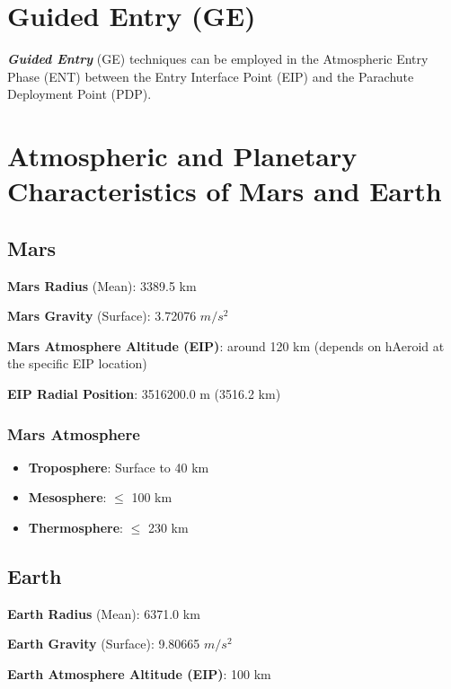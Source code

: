 
\section{Guided Entry (GE)}

    \textbf{\textit{Guided Entry}} (GE) techniques can be employed in the Atmospheric Entry Phase (ENT)
    between the Entry Interface Point (EIP) and the Parachute Deployment Point (PDP).

\section{Atmospheric and Planetary Characteristics of Mars and Earth}

    \subsection{Mars}

        \textbf{Mars Radius} (Mean): 3389.5 km

        \textbf{Mars Gravity} (Surface): 3.72076 $m/s^2$

        \textbf{Mars Atmosphere Altitude (EIP)}: around 120 km (depends on hAeroid at the specific EIP location)

        \textbf{EIP Radial Position}: 3516200.0 m (3516.2 km)

        \subsubsection{Mars Atmosphere}

            \begin{itemize}
                \item \textbf{Troposphere}: Surface to 40 km
                \item \textbf{Mesosphere}: $\leq$ 100 km
                \item \textbf{Thermosphere}: $\leq$ 230 km
            \end{itemize}


    \subsection{Earth}

        \textbf{Earth Radius} (Mean): 6371.0 km

        \textbf{Earth Gravity} (Surface): 9.80665 $m/s^2$

        \textbf{Earth Atmosphere Altitude (EIP)}: 100 km

